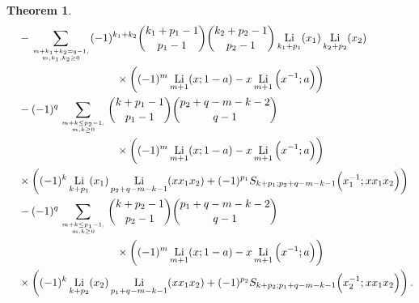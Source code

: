\documentclass[11pt]{article}
\DeclareMathOperator{\Li}{Li}
\theoremstyle{plain}
\newtheorem{thm}{Theorem}[section]
\theoremstyle{definition}
\begin{document}
\begin{thm}
\begin{align}
&\quad-\sum_{m+k_1+k_2=q-1,\atop m,k_1,k_2\geq 0}(-1)^{k_1+k_2}\binom{k_1+p_1-1}{p_1-1}\binom{k_2+p_2-1}{p_2-1}\Li_{k_1+p_1}(x_1)\Li_{k_2+p_2}(x_2)\nonumber\\&\qquad\qquad\qquad\qquad\qquad\times \left((-1)^m\Li_{m+1}(x;1-a)-x \Li_{m+1}\Big(x^{-1};a\Big)\right)\nonumber\\
&\quad-(-1)^q \sum_{m+k\leq p_2-1,\atop m,k\geq 0} \binom{k+p_1-1}{p_1-1}\binom{p_2+q-m-k-2}{q-1} \nonumber\\&\qquad\qquad\qquad\qquad\qquad\times\left((-1)^m\Li_{m+1}(x;1-a)-x \Li_{m+1}\Big(x^{-1};a\Big)\right)\nonumber\\&\quad\times\left((-1)^k\Li_{k+p_1}(x_1)\Li_{p_2+q-m-k-1}(xx_1x_2)+(-1)^{p_1}S_{k+p_1;p_2+q-m-k-1}\Big(x_1^{-1};xx_1x_2\Big)\right)\nonumber\\
&\quad-(-1)^q \sum_{m+k\leq p_1-1,\atop m,k\geq 0} \binom{k+p_2-1}{p_2-1}\binom{p_1+q-m-k-2}{q-1} \nonumber\\&\qquad\qquad\qquad\qquad\qquad\times\left((-1)^m\Li_{m+1}(x;1-a)-x \Li_{m+1}\Big(x^{-1};a\Big)\right)\nonumber\\&\quad\times\left((-1)^k\Li_{k+p_2}(x_2)\Li_{p_1+q-m-k-1}(xx_1x_2)+(-1)^{p_2}S_{k+p_2;p_1+q-m-k-1}\Big(x_2^{-1};xx_1x_2\Big)\right).
\end{align}
\end{thm}
\end{document}
